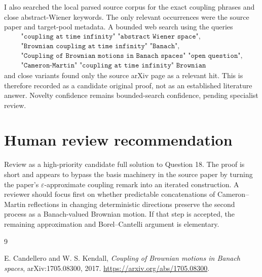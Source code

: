 \documentclass[11pt]{article}
\begin{document}
I also searched the local parsed source corpus for the exact coupling phrases
and close abstract-Wiener keywords.  The only relevant occurrences were the
source paper and target-pool metadata.  A bounded web search using the queries
\[
\begin{gathered}
\texttt{"coupling at time infinity" "abstract Wiener space"},\\
\texttt{"Brownian coupling at time infinity" "Banach"},\\
\texttt{"Coupling of Brownian motions in Banach spaces" "open question"},\\
\texttt{"Cameron-Martin" "coupling at time infinity" Brownian}
\end{gathered}
\]
and close variants found only the source arXiv page as a relevant hit.  This
is therefore recorded as a candidate original proof, not as an established
literature answer.  Novelty confidence remains bounded-search confidence,
pending specialist review.

\section{Human review recommendation}

Review as a high-priority candidate full solution to Question 18.  The proof
is short and appears to bypass the basis machinery in the source paper by
turning the paper's \(\varepsilon\)-approximate coupling remark into an
iterated construction.  A reviewer should focus first on whether predictable
concatenations of Cameron--Martin reflections in changing deterministic
directions preserve the second process as a Banach-valued Brownian motion.
If that step is accepted, the remaining approximation and Borel--Cantelli
argument is elementary.

\begin{thebibliography}{9}

E. Candellero and W. S. Kendall,
\emph{Coupling of Brownian motions in Banach spaces},
arXiv:1705.08300, 2017.
\url{https://arxiv.org/abs/1705.08300}.

\end{thebibliography}
\end{document}
